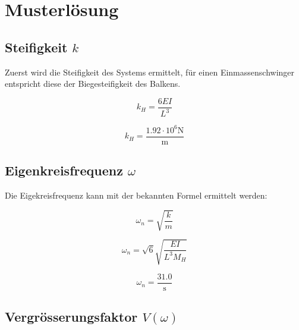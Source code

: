 \documentclass[
  letterpaper,
  DIV=11]{scrreprt}
\begin{document}
\newpage{}

\hypertarget{musterluxf6sung-7}{%
\section{Musterlösung}\label{musterluxf6sung-7}}

\hypertarget{steifigkeit-k}{%
\subsection{\texorpdfstring{Steifigkeit
\(k\)}{Steifigkeit k}}\label{steifigkeit-k}}

Zuerst wird die Steifigkeit des Systems ermittelt, für einen
Einmassenschwinger entspricht diese der Biegesteifigkeit des Balkens.

\begin{equation}k_{H} = \frac{6 E I}{L^{3}}\end{equation}

\begin{equation}k_{H} = \frac{1.92 \cdot 10^{6} \text{N}}{\text{m}}\end{equation}

\hypertarget{eigenkreisfrequenz-omega}{%
\subsection{\texorpdfstring{Eigenkreisfrequenz
\(\omega\)}{Eigenkreisfrequenz \textbackslash omega}}\label{eigenkreisfrequenz-omega}}

Die Eigekreisfrequenz kann mit der bekannten Formel ermittelt werden:

\begin{equation}\omega_{n} = \sqrt{\frac{k}{m}}\end{equation}

\begin{equation}\omega_{n} = \sqrt{6} \sqrt{\frac{E I}{L^{3} M_{H}}}\end{equation}

\begin{equation}\omega_{n} = \frac{31.0}{\text{s}}\end{equation}

\hypertarget{vergruxf6sserungsfaktor-vomega}{%
\subsection{\texorpdfstring{Vergrösserungsfaktor
\(V(\omega)\)}{Vergrösserungsfaktor V(\textbackslash omega)}}\label{vergruxf6sserungsfaktor-vomega}}
\end{document}
